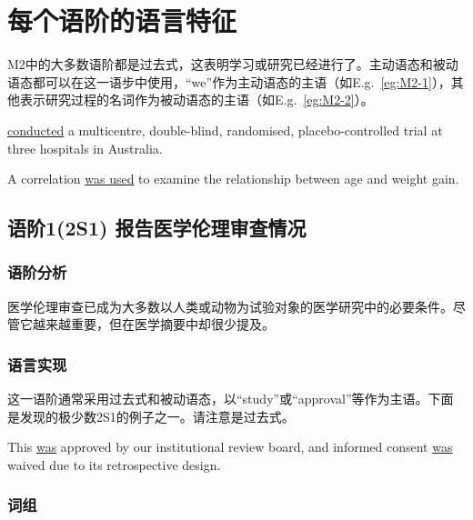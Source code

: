 \documentclass[a4paper]{ctexbook}
\begin{document}
\section{每个语阶的语言特征}

M2中的大多数语阶都是过去式，这表明学习或研究已经进行了。主动语态和被动语态都可以在这一语步中使用，“we”作为主动语态的主语（如E.g.~\ref{eg:M2-1}），其他表示研究过程的名词作为被动语态的主语（如E.g.~\ref{eg:M2-2}）。

\begin{eg}[label={eg:M2-1}]{}
   \uline{conducted} a multicentre, double-blind, randomised, placebo-controlled trial at three hospitals in Australia.
\end{eg}

\begin{eg}[label={eg:M2-2}]{}
  A correlation  \uline{was used} to examine the relationship between age and weight gain.
\end{eg}

  \subsection{语阶1(2S1) 报告医学伦理审查情况}

    \subsubsection{语阶分析}

    医学伦理审查已成为大多数以人类或动物为试验对象的医学研究中的必要条件。尽管它越来越重要，但在医学摘要中却很少提及。

    \subsubsection{语言实现}

    这一语阶通常采用过去式和被动语态，以“study”或“approval”等作为主语。下面是发现的极少数2S1的例子之一。请注意是过去式。
    
    \begin{eg}
      This  \uline{was} approved by our institutional review board, and informed consent \uline{was} waived due to its retrospective design.
    \end{eg}

    \subsubsection{词组}
\end{document}
